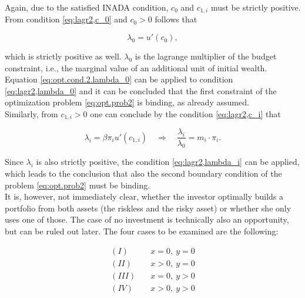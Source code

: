 \vspace{10mm}

\noindent Again, due to the satisfied INADA condition, $c_0$ and $c_{1,i}$ must be strictly positive. From condition \eqref{eq:lagr2,c_0} and $c_0 > 0$ follows that

\begin{equation}\label{eq:opt.cond.2.lambda_0}
    \lambda_0 = u'(c_0),
\end{equation}

\bigskip

\noindent which is strictly positive as well. $\lambda_0$ is the lagrange multiplier of the budget constraint, i.e., the marginal value of an additional unit of initial wealth. Equation \eqref{eq:opt.cond.2.lambda_0} can be applied to condition \eqref{eq:lagr2,lambda_0} and it can be concluded that the first constraint of the optimization problem \eqref{eq:opt.prob2} is binding, as already assumed.\\
Similarly, from $c_{1,i} > 0$ one can conclude by the condition \eqref{eq:lagr2,c_i} that

\begin{equation}\label{eq:opt.cond.2.lambda_i}
    \lambda_i = \beta \pi_i u'(c_{1,i}) \quad \Rightarrow \quad \dfrac{\lambda_i}{\lambda_0}=m_i \cdot \pi_i.
\end{equation}

\bigskip

\noindent Since $\lambda_i$ is also strictly positive, the condition \eqref{eq:lagr2,lambda_i} can be applied, which leads to the conclusion that also the second boundary condition of the problem \eqref{eq:opt.prob2} must be binding.\\

\noindent It is, however, not immediately clear, whether the investor optimally builds a portfolio from both assets (the riskless and the risky asset) or whether she only uses one of those. The case of no investment is technically also an opportunity, but can be ruled out later. The four cases to be examined are the following:

\begin{align*}
    (I)& \quad   x = 0,\ y = 0      \\
    (II)& \quad   x > 0,\ y = 0     \\
    (III)& \quad   x = 0,\ y > 0    \\
    (IV)& \quad   x > 0,\ y > 0
\end{align*}

\bigskip

